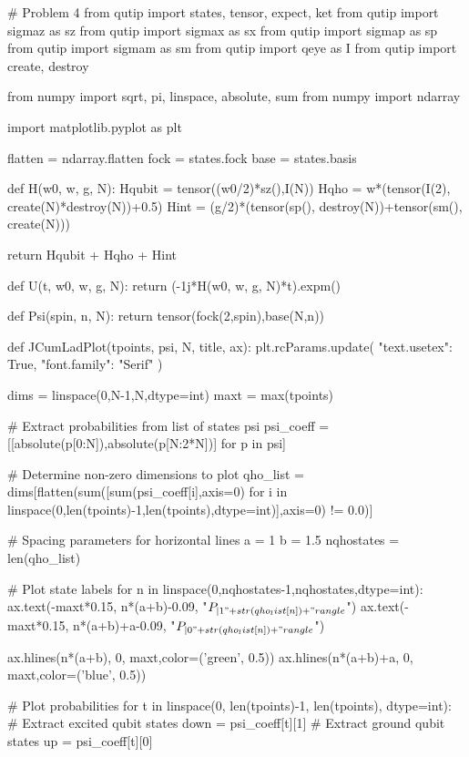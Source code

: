 \begin{python}
# Problem 4
from qutip import states, tensor, expect, ket
from qutip import sigmaz as sz
from qutip import sigmax as sx
from qutip import sigmap as sp
from qutip import sigmam as sm
from qutip import qeye as I
from qutip import create, destroy

from numpy import sqrt, pi, linspace, absolute, sum
from numpy import ndarray

import matplotlib.pyplot as plt

flatten = ndarray.flatten
fock = states.fock
base = states.basis

def H(w0, w, g, N):
    Hqubit = tensor((w0/2)*sz(),I(N))
    Hqho = w*(tensor(I(2), create(N)*destroy(N))+0.5)
    Hint = (g/2)*(tensor(sp(), destroy(N))+tensor(sm(), create(N)))

    return Hqubit + Hqho + Hint

def U(t, w0, w, g, N):
    return (-1j*H(w0, w, g, N)*t).expm()

def Psi(spin, n, N):
    return tensor(fock(2,spin),base(N,n))

def JCumLadPlot(tpoints, psi, N, title, ax):
    plt.rcParams.update({
        "text.usetex": True,
        "font.family": "Serif"
    })

    dims = linspace(0,N-1,N,dtype=int)
    maxt = max(tpoints)

    # Extract probabilities from list of states psi
    psi_coeff = [[absolute(p[0:N]),absolute(p[N:2*N])] for p in psi]
    
    # Determine non-zero dimensions to plot
    qho_list = dims[flatten(sum([sum(psi_coeff[i],axis=0) for i in linspace(0,len(tpoints)-1,len(tpoints),dtype=int)],axis=0) != 0.0)]
    
    # Spacing parameters for horizontal lines
    a = 1
    b = 1.5
    nqhostates = len(qho_list)

    # Plot state labels
    for n in linspace(0,nqhostates-1,nqhostates,dtype=int):
        ax.text(-maxt*0.15, n*(a+b)-0.09, "$P_{|1"+str(qho_list[n])+"\\rangle}$")
        ax.text(-maxt*0.15, n*(a+b)+a-0.09, "$P_{|0"+str(qho_list[n])+"\\rangle}$")

        ax.hlines(n*(a+b), 0, maxt,color=('green', 0.5))
        ax.hlines(n*(a+b)+a, 0, maxt,color=('blue', 0.5))

    # Plot probabilities
    for t in linspace(0, len(tpoints)-1, len(tpoints), dtype=int):
        # Extract excited qubit states
        down = psi_coeff[t][1]
        # Extract ground qubit states
        up = psi_coeff[t][0]


\end{python}
